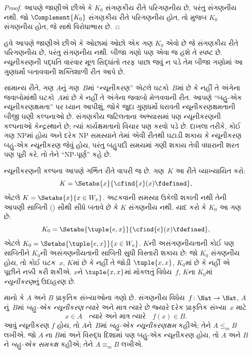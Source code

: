 \begin{proof}
આપણે જાણીએ છીએ કે $K_0$ સંગણકીય રીતે પરિગણનીય છે,
પરંતુ સંગણનીય નથી. જો $\Complement{K_0}$ સંગણકીય રીતે
પરિગણનીય હોત, તો  મુજબ $K_0$
સંગણનીય હોત, જે  સાથે વિરોધાભાસ છે.
\end{proof}
\endgroup


\begingroup
\makeatletter{}\makeatother

\label{guunit:OLP-0243}


\begin{explain}
હવે આપણે જાણીએ છીએ કે ઓછામાં ઓછો એક ગણ $K_0$ એવો છે જે
સંગણકીય રીતે પરિગણનીય છે, પરંતુ સંગણનીય નથી. બીજા ગણો પણ
એવા જ હશે તે સ્પષ્ટ છે. ન્યૂનીકરણની પદ્ધતિ વારંવાર મૂળ
સિદ્ધાંતો તરફ પાછા જવું ન પડે તેમ બીજા ગણોમાં આ ગુણધર્મો
બતાવવાની શક્તિશાળી રીત આપે છે.

સામાન્ય રીતે, ગણ $A$નું ગણ~$B$માં ``ન્યૂનીકરણ'' એટલે
ઘટકો~$B$માં છે કે નહીં તે અંગેના જવાબોમાંથી
ઘટકો~$A$માં છે કે નહીં તે અંગેના જવાબો મેળવવાની
રીત. આપણે ``બહુ-એક ન્યૂનીકરણક્ષમતા'' પર ધ્યાન આપીશું,
જોકે જુદા ગુણધર્મો ધરાવતી ન્યૂનીકરણક્ષમતાની બીજી ઘણી
કલ્પનાઓ છે. સંગણકીય જટિલતાના અભ્યાસમાં પણ ન્યૂનીકરણની
કલ્પનાઓ કેન્દ્રસ્થાને છે; ત્યાં કાર્યક્ષમતાનો વિચાર પણ
કરવો પડે છે. દાખલા તરીકે, કોઈ ગણ NPમાં હોય અને દરેક NP
સમસ્યાને તેમાં એવી રીતથી ઘટાડી શકાય કે ન્યૂનીકરણ બહુ-એક
ન્યૂનીકરણ જેવું હોય, પરંતુ બહુપદી સમયમાં ગણી શકાય તેવી
વધારાની શરત પણ પૂરી કરે, તો તેને ``NP-પૂર્ણ'' કહે છે.

ન્યૂનીકરણની કલ્પના આપણે ગર્ભિત રીતે વાપરી જ છે. ગણ~$K$
આ રીતે વ્યાખ્યાયિત કરો:
\[
K = \Setabs{x}{\cfind{x}(x) \fdefined},
\]
એટલે $K = \Setabs{x}{x \in W_x}$. અટકવાની સમસ્યા
ઉકેલી શકાતી નથી તેની આપણી સાબિતી
() સૌથી સીધે બતાવે છે કે
$K$ સંગણનીય નથી. યાદ કરો કે $K_0$ આ ગણ છે:
\[
K_0 = \Setabs{\tuple{e, x}}{\cfind{e}(x) \fdefined },
\]
એટલે $K_0 = \Setabs{\tuple{e,x}}{x \in W_e}$.
$K$ની અસંગણનીયતાની કોઈ પણ સાબિતીને $K_0$ની
અસંગણનીયતાની સાબિતી સુધી વિસ્તારી શકાય છે: જો $K_0$
સંગણનીય હોય, તો કોઈ ઘટક~$x$, $K$માં છે કે નહીં
તે જોડી $\tuple{x, x}$, $K_0$માં છે કે નહીં એ પૂછીને નક્કી
કરી શકીએ. $x$ને $\tuple{x, x}$માં મોકલતું વિધેય~$f$,
$K$ના $K_0$માં \emph{ન્યૂનીકરણ}નું ઉદાહરણ છે.
\end{explain}

\begin{defn}
માનો કે $A$ અને $B$ પ્રાકૃતિક સંખ્યાઓના ગણો છે.
સંગણનીય વિધેય~$f\colon \Nat \to \Nat$, $A$નું~$B$માં
\emph{બહુ-એક ન્યૂનીકરણ} ત્યારે અને માત્ર ત્યારે છે જ્યારે
દરેક પ્રાકૃતિક સંખ્યા~$x$ માટે
\[
x \in A \quad \text{ત્યારે અને માત્ર ત્યારે} \quad f(x) \in B.
\]
આવું ન્યૂનીકરણ $f$ હોય, તો $A$ને~$B$માં \emph{બહુ-એક
ન્યૂનીકરણક્ષમ} કહીએ; તેને $A \leq_m B$ લખીએ. જો $A$
ના $B$માં અને વિરુદ્ધ દિશામાં પણ બહુ-એક ન્યૂનીકરણ હોય,
તો $A$ અને $B$ને \emph{બહુ-એક સમકક્ષ} કહીએ; તેને
$A \equiv_m B$ લખીએ.
\end{defn}

